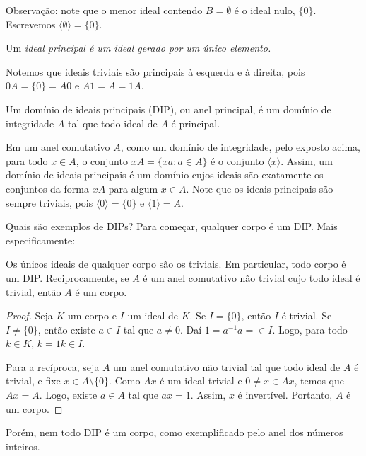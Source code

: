 Observação: note que o menor ideal contendo $B=\emptyset$ é o ideal nulo, $\{0\}$.
Escrevemos $\langle \emptyset\rangle=\{0\}$.

\begin{definition}
    Um \em{ideal principal} é um ideal gerado por um único elemento.
\end{definition}

Notemos que ideais triviais são principais à esquerda e à direita, pois $0A=\{0\}=A0$ e $A1=A=1A$.

\begin{definition}
    Um domínio de ideais principais (DIP), ou anel principal, é um domínio de integridade $A$ tal que todo ideal de $A$ é principal.
\end{definition}

Em um anel comutativo $A$, como um domínio de integridade, pelo exposto acima, para todo $x \in A$, o conjunto $xA=\{xa: a \in A\}$ é o conjunto $\langle x\rangle$.
Assim, um domínio de ideais principais é um domínio cujos ideais são exatamente os conjuntos da forma $xA$ para algum $x \in A$. Note que os ideais principais são sempre triviais, pois $\langle 0\rangle=\{0\}$ e $\langle 1\rangle = A$.

Quais são exemplos de DIPs? Para começar, qualquer corpo é um DIP. Mais especificamente:

\begin{prop}
    Os únicos ideais de qualquer corpo são os triviais.
    Em particular, todo corpo é um DIP.
    Reciprocamente, se $A$ é um anel comutativo não trivial cujo todo ideal é trivial, então $A$ é um corpo.
\end{prop}
\begin{proof}
    Seja $K$ um corpo e $I$ um ideal de $K$.
    Se $I=\{0\}$, então $I$ é trivial.
    Se $I\neq \{0\}$, então existe $a \in I$ tal que $a \neq 0$. Daí $1=a^{-1}a=\in I$.
    Logo, para todo $k \in K$, $k=1k\in I$.

    Para a recíproca, seja $A$ um anel comutativo não trivial tal que todo ideal de $A$ é trivial, e fixe $x \in A\setminus \{0\}$.
    Como $Ax$ é um ideal trivial e $0\neq x \in Ax$, temos que $Ax=A$.
    Logo, existe $a \in A$ tal que $ax=1$. Assim, $x$ é invertível.
    Portanto, $A$ é um corpo.
\end{proof}

Porém, nem todo DIP é um corpo, como exemplificado pelo anel dos números inteiros.

